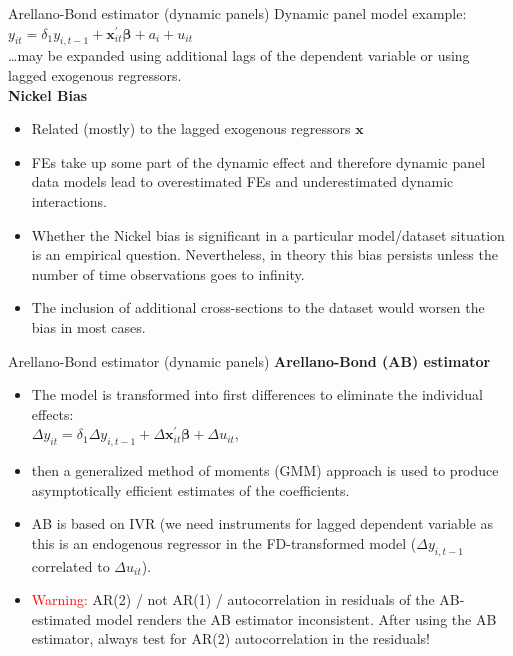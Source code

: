 \documentclass[usenames,dvipsnames]{beamer}
\begin{document}
\begin{frame}{Arellano-Bond estimator (dynamic panels)}
Dynamic panel model example:\\
\medskip
$y_{it} = \delta_1 y_{i,t-1} + \bm{x}^{\prime}_{it} \bm{\beta} + a_i + u_{it}$\\
\medskip
\dots may be expanded using additional lags of the dependent variable or using lagged exogenous regressors.\\
\medskip
\small
\textbf{Nickel Bias}
\begin{itemize}
\item Related (mostly) to the lagged exogenous regressors $\bm{x}$
\item FEs take up some part of the dynamic effect and therefore dynamic panel data models lead to overestimated FEs and underestimated dynamic interactions. 
\item Whether the Nickel bias is significant in a particular model/dataset situation is an empirical question. Nevertheless, in theory this bias persists unless the number of time observations goes to infinity.
\item The inclusion of additional cross-sections to the dataset would worsen the bias in most cases.
\end{itemize}
\end{frame}
\begin{frame}{Arellano-Bond estimator (dynamic panels)}
\textbf{Arellano-Bond (AB) estimator} \\ \medskip
\begin{itemize}
\item The model is transformed into first differences to eliminate the individual effects:\\
$\Delta y_{it} = \delta_1 \Delta y_{i,t-1} + \Delta \bm{x}^{\prime}_{it} \bm{\beta} + \Delta u_{it}$, 
\medskip
\item then a generalized method of moments (GMM) approach is used to produce asymptotically efficient estimates of the coefficients.
\medskip
\item AB is based on IVR (we need instruments for lagged dependent variable as this is an endogenous regressor in the FD-transformed model ($\Delta y_{i,t-1}$ correlated to $\Delta u_{it}$).
\medskip
\item \textcolor{red}{Warning:} AR(2) / not AR(1) / autocorrelation in residuals of the AB-estimated model renders the AB estimator inconsistent. After using the AB estimator, always test for AR(2) autocorrelation in the residuals!
\end{itemize}
\end{frame}
\end{document}
